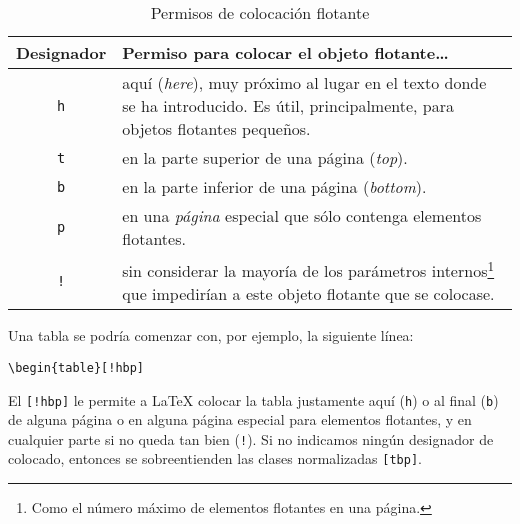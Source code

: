 \begin{table}[!bp]
\caption{Permisos de colocación flotante}\label{tab:permiss}
\noindent \begin{minipage}{\textwidth}
\medskip
\begin{center}
\begin{tabular}{@{}cp{10cm}@{}}
  Designador&Permiso para colocar el objeto flotante\ldots\\ \hline
  \rule{0pt}{1.05em}
\texttt{h} & aquí (\emph{here}), muy próximo al
  lugar en el texto donde se ha introducido. Es útil, principalmente,
  para objetos flotantes pequeños.\\[0.3ex]
\texttt{t} & en la parte superior de una página (\emph{top}).\\[0.3ex]
\texttt{b} & en la parte inferior de una página
  (\emph{bottom}).\\[0.3ex]
\texttt{p} & en una \emph{página} especial que sólo contenga
  elementos flotantes.\\[0.3ex]
\texttt{!} & sin considerar la mayoría de los parámetros
  internos\footnote{Como el número máximo de elementos flotantes en
  una página.} que impedirían a este objeto flotante que se colocase.
\end{tabular}
\end{center}
\end{minipage}
\end{table}

\pagebreak[3]

Una tabla se podría comenzar con, por ejemplo, la siguiente línea:

\begin{code}
\verb|\begin{table}[!hbp]|
\end{code}

\noindent El   \verb|[!hbp]| le  permite a
\LaTeX{}  colocar la  tabla justamente  aquí (\texttt{h})  o al  final
(\texttt{b})  de  alguna  página  o en  alguna  página  especial  para
elementos  flotantes,  y en  cualquier  parte  si  no queda  tan  bien
(\texttt{!}). Si no indicamos  ningún designador de colocado, entonces
se sobreentienden las clases normalizadas \verb|[tbp]|.

